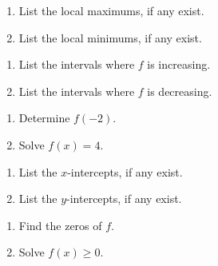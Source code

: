 \begin{multicols}{2}
\begin{enumerate}
\setcounter{enumi}{\value{HW}}

\item  List the local maximums, if any exist.
\item  List the local minimums, if any exist.

\setcounter{HW}{\value{enumi}}
\end{enumerate}
\end{multicols}

\begin{multicols}{2}
\begin{enumerate}
\setcounter{enumi}{\value{HW}}

\item  List the intervals where $f$ is increasing.
\item  List the intervals where $f$ is decreasing.

\setcounter{HW}{\value{enumi}}
\end{enumerate}
\end{multicols}


\begin{multicols}{2}
\begin{enumerate}
\setcounter{enumi}{\value{HW}}

\item  Determine $f(-2)$.
\item  Solve $f(x) = 4$.

\setcounter{HW}{\value{enumi}}
\end{enumerate}
\end{multicols}

\begin{multicols}{2}
\begin{enumerate}
\setcounter{enumi}{\value{HW}}

\item  List the $x$-intercepts, if any exist.
\item  List the $y$-intercepts, if any exist.

\setcounter{HW}{\value{enumi}}
\end{enumerate}
\end{multicols}

\begin{multicols}{2}
\begin{enumerate}
\setcounter{enumi}{\value{HW}}

\item  Find the zeros of $f$.
\item  Solve $f(x) \geq 0$.

\setcounter{HW}{\value{enumi}}
\end{enumerate}
\end{multicols}

